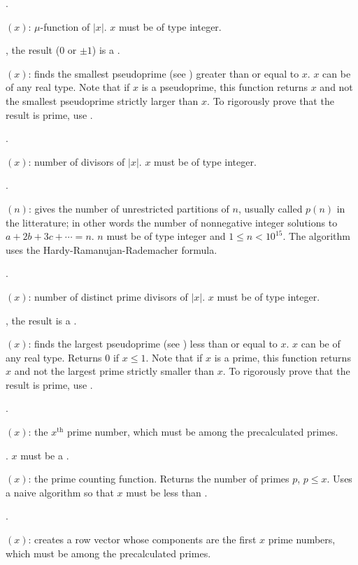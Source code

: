 .

$(x)$:  $\mu$-function of $|x|$. $x$ must
be of type integer.

, the result ($0$ or $\pm 1$) is a .

$(x)$: finds the smallest pseudoprime (see
) greater than or equal to $x$. $x$ can be of any real
type. Note that if $x$ is a pseudoprime, this function returns $x$ and not
the smallest pseudoprime strictly larger than $x$. To rigorously prove that
the result is prime, use .

.

$(x)$: number of divisors of $|x|$. $x$ must be of type
integer.

.

$(n)$: gives the number of unrestricted partitions of
$n$, usually called $p(n)$ in the litterature; in other words the number of
nonnegative integer solutions to $a+2b+3c+\cdots=n$. $n$ must be of type
integer and $1\le n<10^{15}$. The algorithm uses the
Hardy-Ramanujan-Rademacher formula.

.

$(x)$: number of distinct prime divisors of $|x|$. $x$
must be of type integer.

, the result is a .

$(x)$: finds the largest pseudoprime (see
) less than or equal to $x$. $x$ can be of any real type.
Returns 0 if $x\le1$. Note that if $x$ is a prime, this function returns $x$
and not the largest prime strictly smaller than $x$. To rigorously prove that
the result is prime, use .

.

$(x)$: the $x^{\text{th}}$ prime number, which must be among
the precalculated primes.

. $x$ must be a .

$(x)$: the prime counting function. Returns the number of
primes $p$, $p \leq x$. Uses a naive algorithm so that $x$ must be less than
.

.

$(x)$: creates a row vector whose components
are the first $x$ prime numbers, which must be among the precalculated primes.

